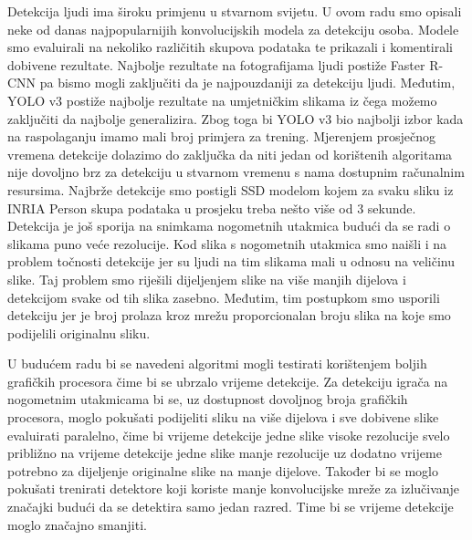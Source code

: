 Detekcija ljudi ima široku primjenu u stvarnom svijetu. U ovom radu smo opisali neke od danas najpopularnijih konvolucijskih modela za detekciju osoba. Modele smo evaluirali na nekoliko različitih skupova podataka te prikazali i komentirali dobivene rezultate. Najbolje rezultate na fotografijama ljudi postiže Faster R-CNN pa bismo mogli zaključiti da je najpouzdaniji za detekciju ljudi. Međutim, YOLO v3 postiže najbolje rezultate na umjetničkim slikama iz čega možemo zaključiti da najbolje generalizira. Zbog toga bi YOLO v3 bio najbolji izbor kada na raspolaganju imamo mali broj primjera za trening.
Mjerenjem prosječnog vremena detekcije dolazimo do zaključka da niti jedan od korištenih algoritama nije dovoljno brz za detekciju u stvarnom vremenu s nama dostupnim računalnim resursima. Najbrže detekcije smo postigli SSD modelom kojem za svaku sliku iz INRIA Person skupa podataka u prosjeku treba nešto više od 3 sekunde. Detekcija je još sporija na snimkama nogometnih utakmica budući da se radi o slikama puno veće rezolucije. Kod slika s nogometnih utakmica smo naišli i na problem točnosti detekcije jer su ljudi na tim slikama mali u odnosu na veličinu slike. Taj problem smo riješili dijeljenjem slike na više manjih dijelova i detekcijom svake od tih slika zasebno. Međutim, tim postupkom smo usporili detekciju jer je broj prolaza kroz mrežu proporcionalan broju slika na koje smo podijelili originalnu sliku. 

U budućem radu bi se navedeni algoritmi mogli testirati korištenjem boljih grafičkih procesora čime bi se ubrzalo vrijeme detekcije. Za detekciju igrača na nogometnim utakmicama bi se, uz dostupnost dovoljnog broja grafičkih procesora, moglo pokušati podijeliti sliku na više dijelova i sve dobivene slike evaluirati paralelno, čime bi vrijeme detekcije jedne slike visoke rezolucije svelo približno na vrijeme detekcije jedne slike manje rezolucije uz dodatno vrijeme potrebno za dijeljenje originalne slike na manje dijelove. Također bi se moglo pokušati trenirati detektore koji koriste manje konvolucijske mreže za izlučivanje značajki budući da se detektira samo jedan razred. Time bi se vrijeme detekcije moglo značajno smanjiti.